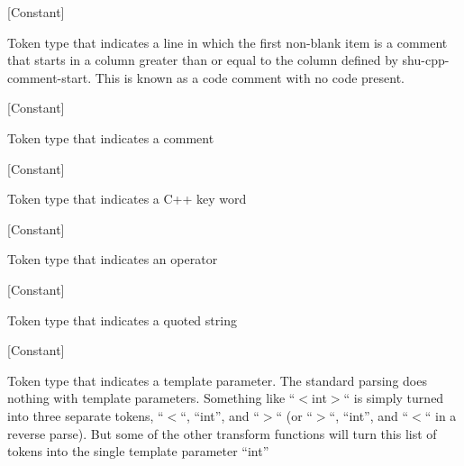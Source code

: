 \vspace{1em}
\noindent
{}
\usebox{\funcname}
 \hfill [Constant]

\begin{doc-string}
Token type that indicates a line in which the first non-blank item is a
comment that starts in a column greater than or equal to the column defined
by shu-cpp-comment-start.  This is known as a code comment with no code present.
\end{doc-string}

\vspace{1em}
\noindent
{}
\usebox{\funcname}
 \hfill [Constant]

\begin{doc-string}
Token type that indicates a comment
\end{doc-string}

\vspace{1em}
\noindent
{}
\usebox{\funcname}
 \hfill [Constant]

\begin{doc-string}
Token type that indicates a C++ key word
\end{doc-string}

\vspace{1em}
\noindent
{}
\usebox{\funcname}
 \hfill [Constant]

\begin{doc-string}
Token type that indicates an operator
\end{doc-string}

\vspace{1em}
\noindent
{}
\usebox{\funcname}
 \hfill [Constant]

\begin{doc-string}
Token type that indicates a quoted string
\end{doc-string}

\vspace{1em}
\noindent
{}
\usebox{\funcname}
 \hfill [Constant]

\begin{doc-string}
Token type that indicates a template parameter.  The standard parsing does nothing
with template parameters.  Something like ``$<$int$>$`` is simply turned into three separate
tokens, ``$<$``, ``int'', and ``$>$`` (or ``$>$``, ``int'', and ``$<$`` in a reverse parse).
But some of the other transform functions will turn this list of tokens into the single
template parameter ``int''
\end{doc-string}

